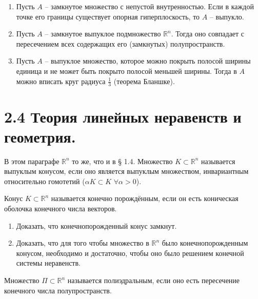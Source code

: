 \begin{enumerate}
		\item Пусть $A$ -- замкнутое множество с непустой внутренностью. Если в каждой точке его границы существует опорная гиперплоскость, то $A$ -- выпукло.

		\item Пусть $A$ -- замкнутое выпуклое подмножество $\mathbb{R}^n$. Тогда оно совпадает с пересечением всех содержащих его (замкнутых) полупространств.

		\item Пусть $A$ -- выпуклое множество, которое можно покрыть полосой ширины единица и не может быть покрыто полосой меньшей ширины. Тогда в $A$ можно вписать круг радиуса $\frac{1}{3}$ (теорема Бланшке).

	\end{enumerate}

	\section{2.4 Теория линейных неравенств и геометрия.}

	В этом параграфе $\mathbb{R}^n$ то же, что и в § 1.4. Множество $K \subset \mathbb{R}^n$ называется выпуклым конусом, если оно является выпуклым множеством, инвариантным относительно гомотетий ($\alpha K \subset K$ $\forall \alpha > 0$).

	Конус $K \subset \mathbb{R}^n$ называется конечно порождённым, если он есть коническая оболочка конечного числа векторов.

	\begin{enumerate}
		\item Доказать, что конечнопорожденный конус замкнут.

		\item Доказать, что для того чтобы множество в $\mathbb{R}^n$ было конечнопорожденным конусом, необходимо и достаточно, чтобы оно было решением конечной системы неравенств.
	\end{enumerate}

	Множество $\Pi \subset \mathbb{R}^n$ называется полиэдральным, если оно есть пересечение конечного числа полупространств.

